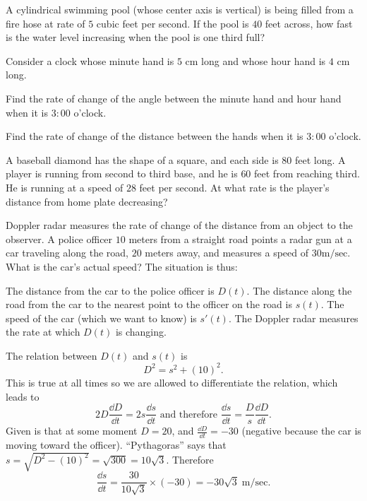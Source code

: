 \begin{multicols}{2}
\problem A cylindrical swimming pool (whose center axis is vertical) is being 
filled from a fire hose at rate of $5$ cubic feet per second.  If the pool is
$40$ feet across, how fast is the water level increasing when the pool is one
third full?


\problem Consider a clock whose minute hand is $5$ cm long and whose hour hand 
is $4$ cm long.

\subprob Find the rate of change of the angle between the minute hand and hour
hand when it is $3:00$ o'clock.

\subprob Find the rate of change of the distance between the hands when it is
$3:00$ o'clock.




\problem A baseball diamond has the shape of a square, and each side is $80$ 
feet long. A player is running from second to third base, and he is $60$ feet
from reaching third. He is running at a speed of $28$ feet per second. At what
rate is the player's distance from home plate decreasing?




\problem Doppler radar measures the rate of change of the distance from an 
object to the observer. A police officer $10$ meters from a straight road points
a radar gun at a car traveling along the road, $20$ meters away, and measures a
  speed of $30 \text{m}/\text{sec}$. What is the car's actual speed?
\answer 
The situation is thus:
\begin{center}
  
\end{center}
The distance from the car to the police officer is $D(t)$.
The distance along the road from the car to the nearest point to the officer
on the road is $s(t)$.  The speed of the car (which we want to know) is $s'(t)$.
The Doppler radar measures the rate at which $D(t)$ is changing.

The relation between $D(t)$ and $s(t)$ is
\[
D^2 = s^2 + (10)^2.
\]
This is true at all times so we are allowed to differentiate the relation,
which leads to
\[
2D \frac{\dd D} {\dd t} = 2s\frac{\dd s} {\dd t}
\text{ and therefore }
\frac{\dd s} {\dd t} = \frac{D} {s} \frac{\dd D} {\dd t}.
\]
Given is that at some moment $D=20$, and $\frac{\dd D} {\dd t} = -30$
(negative because the car is moving toward the officer).
``Pythagoras'' says that $s = \sqrt{D^2-(10)^2} = \sqrt{300} = 10\surd 3$.
Therefore
\[
\frac{\dd s} {\dd t} = \frac{30} {10\surd 3} \times(-30) =
-30\surd 3\; \mathrm{m}/\mathrm{sec}.
\]


\end{multicols}
